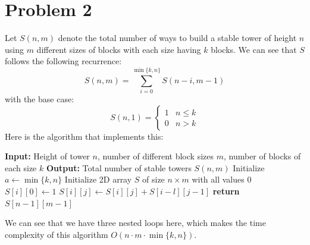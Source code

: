 \documentclass{article}
\begin{document}
\section{Problem 2}
  Let $S(n, m)$ denote the total number of ways to build a stable tower of height $n$ using $m$ different sizes of blocks with each size having $k$ blocks.
  We can see that $S$ follows the following recurrence:
  \[ S(n, m) = \sum_{i=0}^{\min\{k, n\}} S(n - i, m - 1) \]
  with the base case:
  \[ S(n, 1) =
  \begin{cases}
    1 & n \leq k \\
    0 & n > k
  \end{cases} \]
  Here is the algorithm that implements this:
  \begin{algorithm}[H]
    \caption{Number of Stable Towers}
    \begin{algorithmic}[1]
      \State \textbf{Input:} Height of tower $n$, number of different block sizes $m$, number of blocks of each size $k$
      \State \textbf{Output:} Total number of stable towers $S(n, m)$
      \State Initialize $a \gets \min\{k, n\}$
      \State Initialize 2D array $S$ of size $n \times m$ with all values $0$
          \State $S[i][0] \gets 1$
        \EndIf
      \EndFor
              \State $S[i][j] \gets S[i][j] + S[i - l][j - 1]$
            \EndIf
          \EndFor
        \EndFor
      \EndFor
      \State \textbf{return} $S[n - 1][m - 1]$
    \end{algorithmic}
  \end{algorithm}

  We can see that we have three nested loops here, which makes the time complexity of this algorithm $O(n \cdot m \cdot \min\{k, n\})$.
\end{document}
